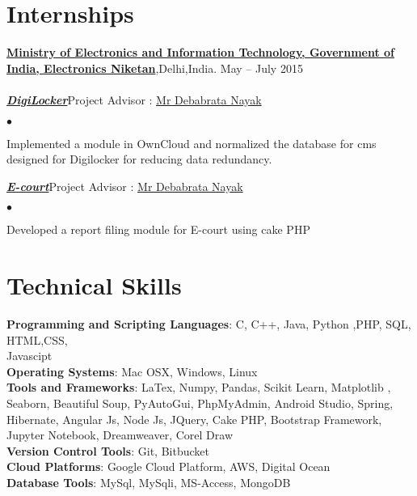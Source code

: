 \documentclass[margin,line]{res}
\newenvironment{list2}{
  \begin{list}{$\bullet$}{%
      \setlength{\itemsep}{0in}
      \setlength{\parsep}{0in} \setlength{\parskip}{0in}
      \setlength{\topsep}{0in} \setlength{\partopsep}{0in}
      \setlength{\leftmargin}{0.2in}}}{\end{list}}
\begin{document}
\begin{resume}
\section{\sc Internships}
{\bf 
\href{http://meity.gov.in/}{ Ministry of Electronics and Information Technology, Government of India, Electronics Niketan}},Delhi,India. \hfill{May -- July 2015}\\\\
{\em \bf \href{https://digilocker.gov.in/}{DigiLocker}}\hfill {Project Advisor : \href {https://www.linkedin.com/in/debabrata-nayak-a911397b/}{ Mr Debabrata Nayak}}
\begin{list2} %
\item Implemented a module in OwnCloud and normalized the database for cms designed for Digilocker for reducing data redundancy.\\
\end{list2}
{\em \bf \href{http://www.ecourts.gov.in/ecourts_home/}{E-court}}\hfill {Project Advisor : \href {https://www.linkedin.com/in/debabrata-nayak-a911397b/}{ Mr Debabrata Nayak}}
\begin{list2} %
\item Developed a report filing module for E-court using cake PHP \\
\end{list2}

\section{\sc Technical Skills}
{\bf Programming and Scripting Languages}:  C, C++, Java, Python ,PHP, SQL, HTML,CSS,\\Javascipt  \\
{\bf Operating Systems}: Mac OSX, Windows, Linux\\
{\bf Tools and Frameworks}: LaTex, Numpy, Pandas, Scikit Learn, Matplotlib , Seaborn, Beautiful Soup, PyAutoGui, PhpMyAdmin, Android Studio, Spring, Hibernate, Angular Js, Node Js, JQuery, Cake PHP,  Bootstrap Framework, Jupyter Notebook,  Dreamweaver, Corel Draw \\
{\bf Version Control Tools}: Git, Bitbucket\\
{\bf Cloud Platforms}: Google Cloud Platform, AWS, Digital Ocean\\
{\bf Database Tools}:  MySql, MySqli, MS-Access, MongoDB\\\\


\end{resume}
\end{document}

